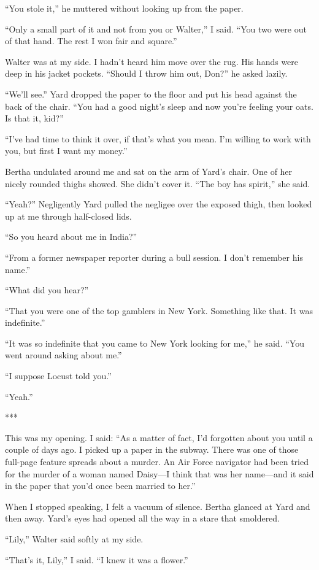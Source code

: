 \documentclass{novel}
\begin{document}
{“You stole it,” he muttered without looking up from the paper.

“Only a small part of it and not from you or Walter,” I said. “You two were out of that hand. The rest I won fair and square.”

Walter was at my side. I hadn’t heard him move over the rug. His hands were deep in his jacket pockets. “Should I throw him out, Don?” he asked lazily.

“We’ll see.” Yard dropped the paper to the floor and put his head against the back of the chair. “You had a good night’s sleep and now you’re feeling your oats. Is that it, kid?”

“I’ve had time to think it over, if that’s what you mean. I’m willing to work with you, but first I want my money.”

Bertha undulated around me and sat on the arm of Yard’s chair. One of her nicely rounded thighs showed. She didn’t cover it. “The boy has spirit,” she said.

“Yeah?” Negligently Yard pulled the negligee over the exposed thigh, then looked up at me through half-closed lids.

“So you heard about me in India?”

“From a former newspaper reporter during a bull session. I don’t remember his name.”

“What did you hear?”

“That you were one of the top gamblers in New York. Something like that. It was indefinite.”

“It was so indefinite that you came to New York looking for me,” he said. “You went around asking about me.”

“I suppose Locust told you.”

“Yeah.”

***

This was my opening. I said: “As a matter of fact, I’d forgotten about you until a couple of days ago. I picked up a paper in the subway. There was one of those full-page feature spreads about a murder. An Air Force navigator had been tried for the murder of a woman named Daisy—I think that was her name—and it said in the paper that you’d once been married to her.”

When I stopped speaking, I felt a vacuum of silence. Bertha glanced at Yard and then away. Yard’s eyes had opened all the way in a stare that smoldered.

“Lily,” Walter said softly at my side.

“That’s it, Lily,” I said. “I knew it was a flower.”

}
\end{document}
